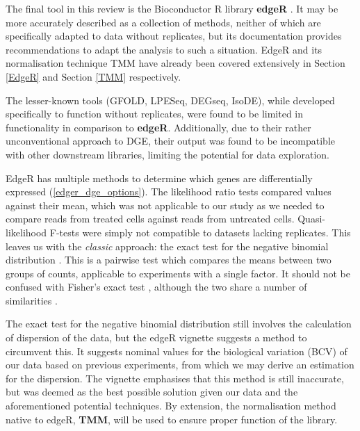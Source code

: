 The final tool in this review is the Bioconductor R library \textbf{edgeR} \citep{edger}. It may be more accurately described as a collection of methods, neither of which are specifically adapted to data without replicates, but its documentation provides recommendations to adapt the analysis to such a situation. EdgeR and its normalisation technique TMM have already been covered extensively in Section \ref{EdgeR} and Section \ref{TMM} respectively. 

The lesser-known tools (GFOLD, LPESeq, DEGseq, IsoDE), while developed specifically to function without replicates, were found to be limited in functionality in comparison to \textbf{edgeR}. Additionally, due to their rather unconventional approach to \ac{DGE}, their output was found to be incompatible with other downstream libraries, limiting the potential for data exploration. 

EdgeR has multiple methods to determine which genes are differentially expressed (\autoref{edger_dge_options}). The likelihood ratio tests \citep{mccarthy2012differential} compared values against their mean, which was not applicable to our study as we needed to compare reads from treated cells against reads from untreated cells. Quasi-likelihood F-tests \citep{lun2016s, lund2012detecting} were simply not compatible to datasets lacking replicates. This leaves us with the \textit{classic} approach: the exact test for the negative binomial distribution \citep{robinson2007moderated, robinson2008small}. This is a pairwise test which compares the means between two groups of counts, applicable to experiments with a single factor. It should not be confused with Fisher's exact test \citep{fisher1922interpretation}, although the two share a number of similarities \citep{chen2014edger}.

The exact test for the negative binomial distribution still involves the calculation of dispersion of the data, but the edgeR vignette suggests a method to circumvent this. It suggests nominal values for the biological variation (\ac{BCV}) of our data based on previous experiments, from which we may derive an estimation for the dispersion. The vignette emphasises that this method is still inaccurate, but was deemed as the best possible solution given our data and the aforementioned potential techniques. By extension, the normalisation method native to edgeR, \textbf{TMM}, will be used to ensure proper function of the library.

